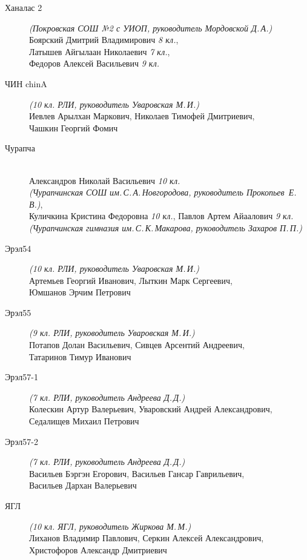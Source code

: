 \begin{description}
\item[Ханалас 2] \textit{(Покровская СОШ №2 с УИОП, руководитель Мордовской Д.\,А.)} \\
Боярский Дмитрий Владимирович \textit{8 кл.}, \\
Латышев Айгылаан Николаевич \textit{7 кл.}, \\
Федоров Алексей Васильевич \textit{9 кл.}

\item[ЧИН chinA] \textit{(10 кл. РЛИ, руководитель Уваровская М.\,И.)} \\
Иевлев Арылхан Маркович, Николаев Тимофей Дмитриевич, \\
Чашкин Георгий Фомич

\item[Чурапча] ~ \\
Александров Николай Васильевич \textit{10 кл. \\
(Чурапчинская СОШ им.\,С.\,А.\,Новгородова, руководитель Прокопьев~Е.\,В.)}, \\
Куличкина Кристина Федоровна \textit{10 кл.}, Павлов Артем Айаалович \textit{9 кл. \\
(Чурапчинская гимназия им.\,С.\,К.\,Макарова, руководитель Захаров П.\,П.)}

\item[Эрэл54] \textit{(10 кл. РЛИ, руководитель Уваровская М.\,И.)} \\
Артемьев Георгий Иванович, Лыткин Марк Сергеевич, \\
Юмшанов Эрчим Петрович

\item[Эрэл55] \textit{(9 кл. РЛИ, руководитель Уваровская М.\,И.)} \\
Потапов Долан Васильевич, Сивцев Арсентий Андреевич, \\
Татаринов Тимур Иванович

\item[Эрэл57-1] \textit{(7 кл. РЛИ, руководитель Андреева Д.\,Д.)} \\
Колескин Артур Валерьевич, Уваровский Андрей Александрович, \\
Седалищев Михаил Петрович

\item[Эрэл57-2] \textit{(7 кл. РЛИ, руководитель Андреева Д.\,Д.)} \\
Васильев Бэргэн Егорович, Васильев Гансар Гаврильевич, \\
Васильев Дархан Валерьевич

\item[ЯГЛ] \textit{(10 кл. ЯГЛ, руководитель Жиркова М.\,М.)} \\
Лиханов Владимир Павлович, Серкин Алексей Александрович, \\
Христофоров Александр Дмитриевич


\end{description}
